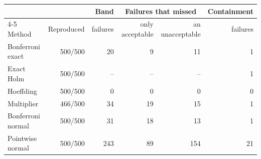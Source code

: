 \begin{tabular}{lrrrrr}
\toprule
 & & Band & \multicolumn{2}{c}{Failures that missed} & Containment \\
\cmidrule(lr){4-5}
Method & Reproduced & failures & only acceptable & an unacceptable & failures \\
\midrule
Bonferroni exact & 500/500 & 20 & 9 & 11 & 1 \\
Exact Holm & 500/500 & -- & -- & -- & 1 \\
Hoeffding & 500/500 & 0 & 0 & 0 & 0 \\
Multiplier & 466/500 & 34 & 19 & 15 & 1 \\
Bonferroni normal & 500/500 & 31 & 18 & 13 & 1 \\
Pointwise normal & 500/500 & 243 & 89 & 154 & 21 \\
\bottomrule
\end{tabular}
